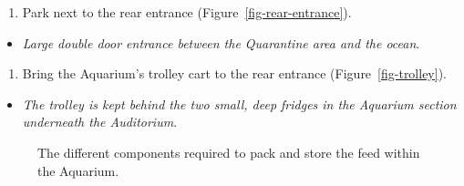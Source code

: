 \documentclass[
  12pt,
]{report}
\providecommand{\tightlist}{%
  \setlength{\itemsep}{0pt}\setlength{\parskip}{0pt}}\usepackage{longtable,booktabs,array}
\begin{document}
\begin{enumerate}
\def\labelenumi{\arabic{enumi}.}
\setcounter{enumi}{14}
\tightlist
\item
  Park next to the rear entrance (Figure~\ref{fig-rear-entrance}).
\end{enumerate}

\begin{itemize}
\tightlist
\item
  \emph{Large double door entrance between the Quarantine area and the
  ocean}.
\end{itemize}

\begin{enumerate}
\def\labelenumi{\arabic{enumi}.}
\setcounter{enumi}{15}
\tightlist
\item
  Bring the Aquarium's trolley cart to the rear entrance
  (Figure~\ref{fig-trolley}).
\end{enumerate}

\begin{itemize}
\tightlist
\item
  \emph{The trolley is kept behind the two small, deep fridges in the
  Aquarium section underneath the Auditorium}.
\end{itemize}

\begin{figure}[H]

\begin{minipage}[t]{0.33\linewidth}

{\centering 


}

\end{minipage}%
%
\begin{minipage}[t]{0.33\linewidth}

{\centering 


}

\end{minipage}%
%
\begin{minipage}[t]{0.33\linewidth}

{\centering 


}

\end{minipage}%

\caption{\label{fig-feed-packing}The different components required to
pack and store the feed within the Aquarium.}

\end{figure}
\end{document}
